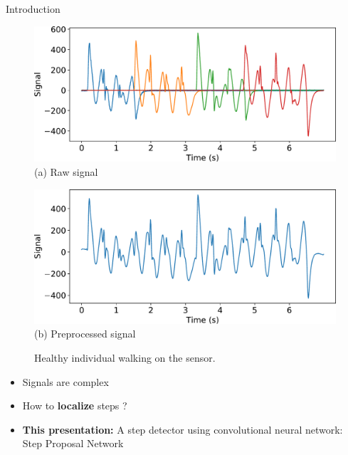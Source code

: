 \documentclass[9pt,t,aspectratio=1610]{beamer}
\begin{document}
\begin{frame}{Introduction}{}
\pause
\begin{figure}[h]
    \begin{minipage}{\linewidth}
        \centering
        \begin{minipage}{0.49\linewidth}
            \centering
            \includegraphics[width=0.9\linewidth]{signal_walk_young_female_before_preproc_2.pdf}\\
            {\small (a)\; Raw signal}
        \end{minipage}
        \begin{minipage}{0.49\linewidth}
            \centering
            \includegraphics[width=0.9\linewidth]{signal_walk_young_female_after_preproc_2.pdf}\\
            {\small (b)\; Preprocessed signal}
        \end{minipage}
    \end{minipage}
    \caption{Healthy individual walking on the sensor.}
    \label{fig:walk_class_ex_preprocessing}
\end{figure}
\begin{itemize}
    \item Signals are complex
    \item How to \textbf{localize} steps ?
    \item \textbf{This presentation:} A step detector using convolutional neural network: Step Proposal Network
\end{itemize}

\end{frame}
%
\end{document}
